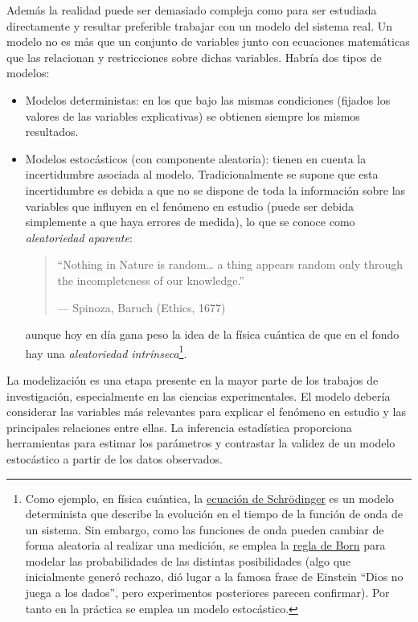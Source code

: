 \documentclass[
]{book}
\theoremstyle{break}
\theoremstyle{definition}
\theoremstyle{definition}
\theoremstyle{definition}
\theoremstyle{definition}
\theoremstyle{remark}
\begin{document}
Además la realidad puede ser demasiado compleja como para ser estudiada directamente y resultar preferible trabajar con un modelo del sistema real.
Un modelo no es más que un conjunto de variables junto con ecuaciones matemáticas que las relacionan y restricciones sobre dichas variables.
Habría dos tipos de modelos:

\begin{itemize}
\item
  Modelos deterministas: en los que bajo las mismas condiciones (fijados los valores de las variables explicativas) se obtienen siempre los mismos resultados.
\item
  Modelos estocásticos (con componente aleatoria): tienen en cuenta la incertidumbre asociada al modelo. Tradicionalmente se supone que esta incertidumbre es debida a que no se dispone de toda la información sobre las variables que influyen en el fenómeno en estudio (puede ser debida simplemente a que haya errores de medida), lo que se conoce como \emph{aleatoriedad aparente}:

  \begin{quote}
  ``Nothing in Nature is random\ldots{} a thing appears random only through the incompleteness of our knowledge.''

  --- Spinoza, Baruch (Ethics, 1677)
  \end{quote}

  aunque hoy en día gana peso la idea de la física cuántica de que en el fondo hay una \emph{aleatoriedad intrínseca}\footnote{Como ejemplo, en física cuántica, la \href{https://es.wikipedia.org/wiki/Ecuaci\%C3\%B3n_de_Schr\%C3\%B6dinger}{ecuación de Schrödinger} es un modelo determinista que describe la evolución en el tiempo de la función de onda de un sistema. Sin embargo, como las funciones de onda pueden cambiar de forma aleatoria al realizar una medición, se emplea la \href{https://en.wikipedia.org/wiki/Born_rule}{regla de Born} para modelar las probabilidades de las distintas posibilidades (algo que inicialmente generó rechazo, dió lugar a la famosa frase de Einstein ``Dios no juega a los dados'', pero experimentos posteriores parecen confirmar). Por tanto en la práctica se emplea un modelo estocástico.}.
\end{itemize}

La modelización es una etapa presente en la mayor parte de los trabajos de investigación, especialmente en las ciencias experimentales.
El modelo debería considerar las variables más relevantes para explicar el fenómeno en estudio y las principales relaciones entre ellas.
La inferencia estadística proporciona herramientas para estimar los parámetros y contrastar la validez de un modelo estocástico a partir de los datos observados.
\end{document}
